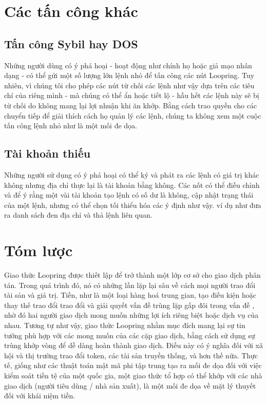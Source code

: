 \documentclass[12pt,a4paper]{article}
\begin{document}
\begin{multicols}{2}
\section{Các tấn công khác}

\subsection{Tấn công Sybil hay DOS}
Những người dùng có ý phá hoại - hoạt động như chính họ hoặc giả mạo nhân dạng - có thể gửi một số lượng lớn lệnh nhỏ để tấn công các nút Loopring. Tuy nhiên, vì chúng tôi cho phép các nút từ chối các lệnh như vậy dựa trên các tiêu chí của riêng mình - mà chúng có thể ẩn hoặc tiết lộ - hầu hết các lệnh này sẽ bị từ chối do không mang lại lợi nhuận khi ăn khớp. Bằng cách trao quyền cho các chuyển tiếp để giải thích cách họ quản lý các lệnh, chúng ta không xem một cuộc tấn công lệnh nhỏ như là một mối đe dọa.

\subsection{Tài khoản thiếu}
Những người sử dụng có ý phá hoại có thể ký và phát ra các lệnh có giá trị khác không nhưng địa chỉ thực lại là tài khoản bằng không. Các nốt có thể điều chỉnh và để ý rằng một vài tài khoản tạo lệnh có số dư là không, cập nhật trạng thái của một lệnh, nhưng có thể chọn tối thiểu hóa các ý định như vậy. ví dụ như đưa ra danh sách đen địa chỉ và thả lệnh liên quan.

\section{Tóm lược}
Giao thức Loopring được thiết lập để trở thành một lớp cơ sở cho giao dịch phân tán. Trong quá trình đó, nó có những lần lặp lại sâu về cách mọi người trao đổi tài sản và giá trị. Tiền, như là một loại hàng hoá trung gian, tạo điều kiện hoặc thay thế trao đổi trao đổi và giải quyết vấn đề trùng lặp gấp đôi trong vấn đề \cite{dannen2017introducing}, nhờ đó hai người giao dịch mong muốn những lợi ích riêng biệt hoặc dịch vụ của nhau. Tương tự như vậy, giao thức Loopring nhằm mục đích mang lại sự tin tưởng phù hợp với các mong muốn của các cặp giao dịch, bằng cách sử dụng sự trùng khớp vòng để dễ dàng hoàn thành giao dịch. Điều này có ý nghĩa đối với xã hội và thị trường trao đổi token, các tài sản truyền thống, và hơn thế nữa. Thực tế, giống như các thuật toán mật mã phi tập trung tạo ra mối đe dọa đối với việc kiểm soát tiền tệ của một quốc gia, một giao thức tổ hợp có thể khớp với các nhà giao dịch (người tiêu dùng / nhà sản xuất), là một mối đe dọa về mặt lý thuyết đối với khái niệm tiền.


\end{multicols}
\end{document}
